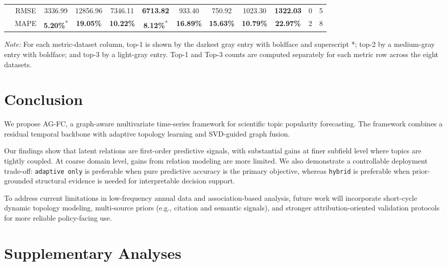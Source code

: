 \documentclass[runningheads]{llncs}
\newcommand{\best}[1]{\cellcolor{gray!55}\textbf{#1}\textsuperscript{*}}
\newcommand{\second}[1]{\cellcolor{gray!33}\textbf{#1}}
\newcommand{\third}[1]{\cellcolor{gray!16}#1}
\begin{document}
\begin{table}[htbp]
{\begin{tabular}{>{\centering\arraybackslash}m{2.6cm}c*{8}{c}cc}
 & RMSE & 3336.99 & 12856.96 & \third{7346.11} & \second{6713.82} & \third{933.40} & \third{750.92} & 1023.30 & \second{1322.03} & 0 & 5 \\
 & MAPE & \best{5.20\%} & \second{19.05\%} & \second{10.22\%} & \best{8.12\%} & \second{16.89\%} & \second{15.63\%} & \second{10.79\%} & \second{22.97\%} & 2 & 8 \\
\bottomrule
\end{tabular}
}
\endgroup
\vspace{2pt}
{\raggedright\footnotesize\textit{Note:} For each metric-dataset column, top-1 is shown by the darkest gray entry with boldface and superscript *; top-2 by a medium-gray entry with boldface; and top-3 by a light-gray entry. Top-1 and Top-3 counts are computed separately for each metric row across the eight datasets.\par}
\end{table}
\FloatBarrier

\section{Conclusion}
We propose AG-FC, a graph-aware multivariate time-series framework for scientific topic popularity forecasting. The framework combines a residual temporal backbone with adaptive topology learning and SVD-guided graph fusion.

Our findings show that latent relations are first-order predictive signals, with substantial gains at finer subfield level where topics are tightly coupled. At coarse domain level, gains from relation modeling are more limited. We also demonstrate a controllable deployment trade-off: \texttt{adaptive only} is preferable when pure predictive accuracy is the primary objective, whereas \texttt{hybrid} is preferable when prior-grounded structural evidence is needed for interpretable decision support.

To address current limitations in low-frequency annual data and association-based analysis, future work will incorporate short-cycle dynamic topology modeling, multi-source priors (e.g., citation and semantic signals), and stronger attribution-oriented validation protocols for more reliable policy-facing use.




\appendix
\setcounter{figure}{0}
\setcounter{table}{0}
\renewcommand{\thefigure}{A\arabic{figure}}
\renewcommand{\thetable}{A\arabic{table}}
\section{Supplementary Analyses}
\end{document}
